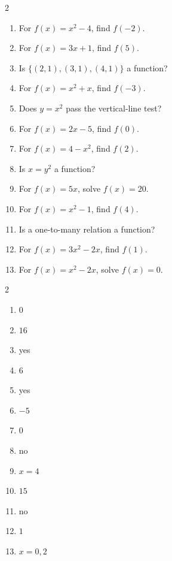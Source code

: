 \documentclass[11pt]{article}
\begin{document}
\begin{recapbox}
\begin{multicols}{2}
\small
\begin{enumerate}[leftmargin=*,itemsep=3pt]
  \item For $f(x)=x^2-4$, find $f(-2)$.
  \item For $f(x)=3x+1$, find $f(5)$.
  \item Is $\{(2,1),(3,1),(4,1)\}$ a function?
  \item For $f(x)=x^2+x$, find $f(-3)$.
  \item Does $y=x^2$ pass the vertical-line test?
  \item For $f(x)=2x-5$, find $f(0)$.
  \item For $f(x)=4-x^2$, find $f(2)$.
  \item Is $x=y^2$ a function?
  \item For $f(x)=5x$, solve $f(x)=20$.
  \item For $f(x)=x^2-1$, find $f(4)$.
  \item Is a one-to-many relation a function?
  \item For $f(x)=3x^2-2x$, find $f(1)$.
  \item For $f(x)=x^2-2x$, solve $f(x)=0$.
\end{enumerate}
\end{multicols}
\end{recapbox}

\begin{keybox}
\begin{multicols}{2}
\small
\begin{enumerate}[leftmargin=*,itemsep=3pt]
  \item $0$
  \item $16$
  \item yes
  \item $6$
  \item yes
  \item $-5$
  \item $0$
  \item no
  \item $x=4$
  \item $15$
  \item no
  \item $1$
  \item $x=0,2$
\end{enumerate}
\end{multicols}
\end{keybox}
\end{document}
